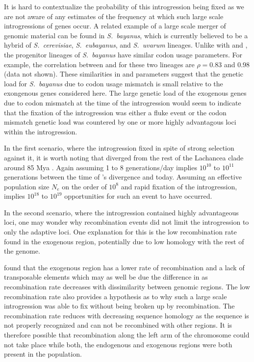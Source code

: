 It is hard to contextualize the probability of this introgression being fixed as we are not aware of any estimates of the frequency at which such large scale introgressions of genes occur.
A related example of a large scale merger of genomic material can be found in \emph{S.~bayanus}, which is currently believed to be a hybrid of \emph{S.~cerevisiae}, \emph{S.~eubayanus}, and \emph{S.~uvarum} lineages.
Unlike with \kluyveri and \gossypii, the  progenitor lineages of \emph{S.~bayanus} have similar codon usage parameters.
For example, the correlation between \DM and \DE for these two lineages are  $\rho = 0.83$ and  $0.98$ (data not shown).
These similarities in \DM and \DE parameters suggest that the genetic load for \emph{S.~bayanus} due to codon usage mismatch is small relative to the exongenous genes considered here. 
The large genetic load of the exogenous genes due to codon mismatch at the time of the introgression would seem to indicate that the fixation of the introgression was either a fluke event or the codon mismatch genetic load was countered by one or more highly advantagous loci within the introgression.

In the  first scenario, where the introgression fixed in spite of strong selection against it, it is worth noting that \kluyveri diverged from the rest of the Lachancea clade around 85 Mya \citep{kensche2008, MHM2015}.
Again assuming 1 to 8 generations/day implies $10^{10}$ to $10^{11}$ generations between the time of \kluyveri's divergence and today.
Assuming an effective population size $N_e$ on the order of $10^8$ \citep{wagner2005} and rapid fixation of the introgression, implies $10^{18}$ to $10^{19}$ opportunities for such an event to have occurred.

In the second scenario, where the introgression contained highly advantageous loci, one may wonder why recombination events did not limit the introgression to only the adaptive loci.
One explanation for this is the low recombination rate found in the exogenous region, potentially due to low homology with the rest of the genome.

\citet{payen2009} found that the exogenous region has a lower rate of recombination and a lack of transposable elements which may as well be due the difference in \GC as recombination rate decreases with dissimilarity between genomic regions.
The low recombination rate also provides a hypothesis as to why such a large scale introgression was able to fix without being broken up by recombination.
The recombination rate reduces with decreasing sequence homology as the sequence is not properly recognized and can not be recombined with other regions.
It is therefore possible that recombination along the left arm of the \kluyveri chromosome could not take place while both, the endogenous and exogenous regions were both present in the population.

